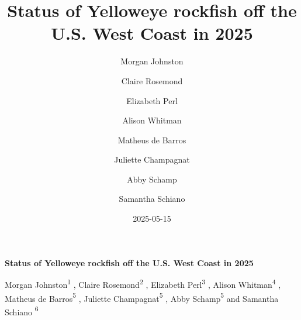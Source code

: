 \documentclass[
]{scrartcl}
\title{Status of Yelloweye rockfish off the U.S. West Coast in 2025}
\author{Morgan Johnston \and Claire Rosemond \and Elizabeth
Perl \and Alison Whitman \and Matheus de Barros \and Juliette
Champagnat \and Abby Schamp \and Samantha Schiano}
\date{2025-05-15}
\begin{document}
  \begin{titlepage}

  \begin{minipage}[b][\textheight][s]{\textwidth}


  \raggedright




  {\huge\bfseries\nohyphens{Status of Yelloweye rockfish off the U.S.
  West Coast in 2025}}\\[1\baselineskip]



  \vspace{1\baselineskip}


  \vspace{1\baselineskip}

   {\large{Morgan Johnston}}{\textsuperscript{1}}%
  ,
   {\large{Claire Rosemond}}{\textsuperscript{2}}%
  ,
   {\large{Elizabeth Perl}}{\textsuperscript{3}}%
  ,
   {\large{Alison Whitman}}{\textsuperscript{4}}%
  ,
   {\large{Matheus de Barros}}{\textsuperscript{5}}%
  ,
   {\large{Juliette Champagnat}}{\textsuperscript{5}}%
  ,
   {\large{Abby Schamp}}{\textsuperscript{5}}%
  { and \large{Samantha Schiano}}%
  {\textsuperscript{6}}%



\end{minipage}
\end{titlepage}
\end{document}
